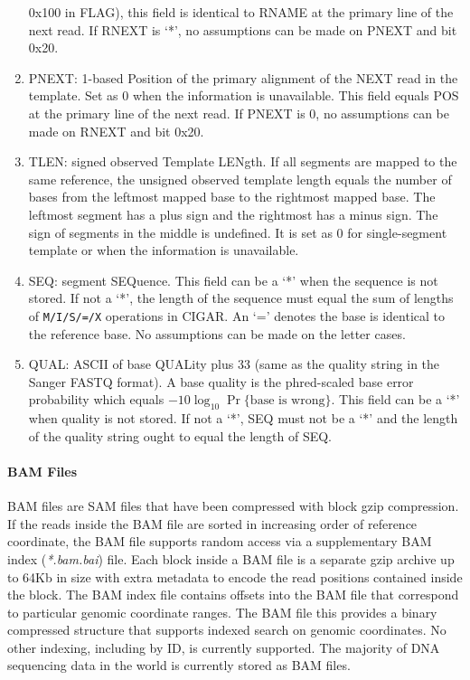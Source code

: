 \begin{enumerate}
      0x100 in {\sf FLAG}), this field is identical to {\sf RNAME} at the primary line of the
      next read.  If {\sf
        RNEXT} is `*', no assumptions can be made on {\sf PNEXT} and bit
      0x20.
    \item {\sf PNEXT}: 1-based Position of the primary alignment of the NEXT read in the template. Set as
      0 when the information is unavailable. This field equals {\sf POS} at the primary line of
      the next read. If {\sf PNEXT} is 0, no assumptions can be made on
      {\sf RNEXT} and bit 0x20.
    \item {\sf TLEN}: signed observed Template LENgth. If all segments are
      mapped to the same reference, the unsigned observed template length
      equals the number of bases from the leftmost mapped base to the
      rightmost mapped base. The leftmost segment has a plus sign and the
      rightmost has a minus sign. The sign of segments in the middle is
      undefined. It is set as 0 for single-segment template or when the
      information is unavailable.
    \item {\sf SEQ}: segment SEQuence. This field can be a `*' when the
      sequence is not stored. If not a `*', the length of the sequence must
      equal the sum of lengths of {\tt M/I/S/=/X} operations in {\sf CIGAR}.
      An `=' denotes the base is identical to the reference base. No
      assumptions can be made on the letter cases.
    \item {\sf QUAL}: ASCII of base QUALity plus 33 (same as the quality
      string in the Sanger FASTQ format). A base quality is the phred-scaled
      base error probability which equals $-10\log_{10}\Pr\{\mbox{base is
        wrong}\}$. This field can be a `*' when quality is not stored. If
      not a `*', {\sf SEQ} must not be a `*' and the length of the quality string
      ought to equal the length of {\sf SEQ}.
    \end{enumerate}
\paragraph{BAM Files}

BAM files are SAM files that have been compressed with block gzip compression\autocite{li2011tabix}. If the reads inside the BAM file are sorted in increasing order of reference coordinate, the BAM file supports random access via a supplementary BAM index (\emph{*.bam.bai}) file. Each block inside a BAM file is a separate gzip archive up to 64Kb in size with extra metadata to encode the read positions contained inside the block. The BAM index file contains offsets into the BAM file that correspond to particular genomic coordinate ranges. The BAM file this provides a binary compressed structure that supports indexed search on genomic coordinates. No other indexing, including by ID, is currently supported. The majority of DNA sequencing data in the world is currently stored as BAM files.

